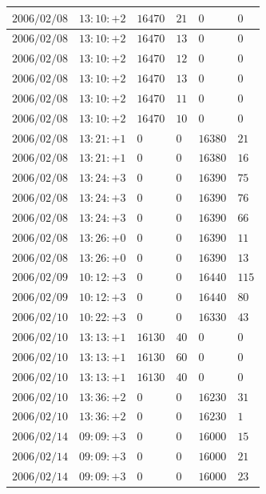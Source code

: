 \documentclass[a4j,papersize,disablejfam,slide,14pt]{jsarticle}
\begin{document}
\begin{description}
\begin{center}
\begin{longtable}{|l|l|l|l|l|l|}
					$2006/02/08$ & $13:10:+2$  & $16470$ & $21$ & $0$ & $0$ \\ \hline
					$2006/02/08$ & $13:10:+2$  & $16470$ & $13$ & $0$ & $0$ \\ \hline
					$2006/02/08$ & $13:10:+2$  & $16470$ & $12$ & $0$ & $0$ \\ \hline
					$2006/02/08$ & $13:10:+2$  & $16470$ & $13$ & $0$ & $0$ \\ \hline
					$2006/02/08$ & $13:10:+2$  & $16470$ & $11$ & $0$ & $0$ \\ \hline
					$2006/02/08$ & $13:10:+2$  & $16470$ & $10$ & $0$ & $0$ \\ \hline
					$2006/02/08$ & $13:21:+1$  & $0$ & $0$ & $16380$ & $21$ \\ \hline
					$2006/02/08$ & $13:21:+1$  & $0$ & $0$ & $16380$ & $16$ \\ \hline
					$2006/02/08$ & $13:24:+3$  & $0$ & $0$ & $16390$ & $75$ \\ \hline
					$2006/02/08$ & $13:24:+3$  & $0$ & $0$ & $16390$ & $76$ \\ \hline
					$2006/02/08$ & $13:24:+3$  & $0$ & $0$ & $16390$ & $66$ \\ \hline
					$2006/02/08$ & $13:26:+0$  & $0$ & $0$ & $16390$ & $11$ \\ \hline
					$2006/02/08$ & $13:26:+0$  & $0$ & $0$ & $16390$ & $13$ \\ \hline
					$2006/02/09$ & $10:12:+3$  & $0$ & $0$ & $16440$ & $115$ \\ \hline
					$2006/02/09$ & $10:12:+3$  & $0$ & $0$ & $16440$ & $80$ \\ \hline
					$2006/02/10$ & $10:22:+3$  & $0$ & $0$ & $16330$ & $43$ \\ \hline
					$2006/02/10$ & $13:13:+1$  & $16130$ & $40$ & $0$ & $0$ \\ \hline
					$2006/02/10$ & $13:13:+1$  & $16130$ & $60$ & $0$ & $0$ \\ \hline
					$2006/02/10$ & $13:13:+1$  & $16130$ & $40$ & $0$ & $0$ \\ \hline
					$2006/02/10$ & $13:36:+2$  & $0$ & $0$ & $16230$ & $31$ \\ \hline
					$2006/02/10$ & $13:36:+2$  & $0$ & $0$ & $16230$ & $1$ \\ \hline
					$2006/02/14$ & $09:09:+3$  & $0$ & $0$ & $16000$ & $15$ \\ \hline
					$2006/02/14$ & $09:09:+3$  & $0$ & $0$ & $16000$ & $21$ \\ \hline
					$2006/02/14$ & $09:09:+3$  & $0$ & $0$ & $16000$ & $23$ \\ \hline

\end{longtable}
\end{center}
\end{description}
\end{document}
